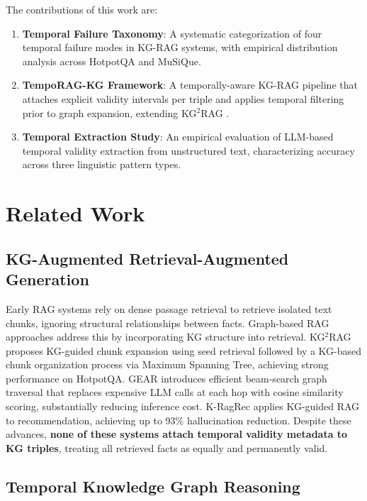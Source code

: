 \documentclass[11pt]{article}
\begin{document}
The contributions of this work are:
\begin{enumerate}
  \item \textbf{Temporal Failure Taxonomy}: A systematic categorization of
        four temporal failure modes in KG-RAG systems, with empirical
        distribution analysis across HotpotQA and MuSiQue.
  \item \textbf{TempoRAG-KG Framework}: A temporally-aware KG-RAG pipeline
        that attaches explicit validity intervals per triple and applies
        temporal filtering prior to graph expansion, extending
        KG$^2$RAG \cite{zhu2025kg2rag}.
  \item \textbf{Temporal Extraction Study}: An empirical evaluation of
        LLM-based temporal validity extraction from unstructured text,
        characterizing accuracy across three linguistic pattern types.
\end{enumerate}

\section{Related Work}

\subsection{KG-Augmented Retrieval-Augmented Generation}

Early RAG systems \cite{lewis2020retrieval} rely on dense passage retrieval
to retrieve isolated text chunks, ignoring structural relationships between
facts. Graph-based RAG approaches address this by incorporating KG structure
into retrieval. KG$^2$RAG \cite{zhu2025kg2rag} proposes KG-guided chunk
expansion using seed retrieval followed by a KG-based chunk organization
process via Maximum Spanning Tree, achieving strong performance on
HotpotQA. GEAR \cite{ma2025gear} introduces efficient beam-search graph
traversal that replaces expensive LLM calls at each hop with cosine
similarity scoring, substantially reducing inference cost. K-RagRec
\cite{wang2025kragrec} applies KG-guided RAG to recommendation, achieving
up to 93\% hallucination reduction. Despite these advances,
\textbf{none of these systems attach temporal validity metadata to KG
triples}, treating all retrieved facts as equally and permanently valid.

\subsection{Temporal Knowledge Graph Reasoning}
\end{document}
